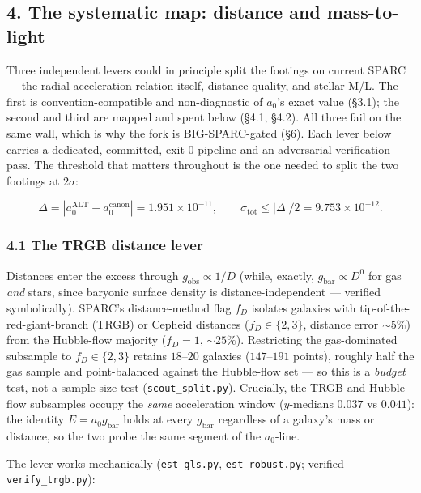 \documentclass[
]{article}
\begin{document}
\subsection{4. The systematic map: distance and
mass-to-light}\label{the-systematic-map-distance-and-mass-to-light}

Three independent levers could in principle split the footings on
current SPARC --- the radial-acceleration relation itself, distance
quality, and stellar M/L. The first is convention-compatible and
non-diagnostic of \(a_0\)'s exact value (§3.1); the second and third are
mapped and spent below (§4.1, §4.2). All three fail on the same wall,
which is why the fork is BIG-SPARC-gated (§6). Each lever below carries
a dedicated, committed, exit-0 pipeline and an adversarial verification
pass. The threshold that matters throughout is the one needed to split
the two footings at \(2\sigma\):

\[\Delta=|a_0^\mathrm{ALT}-a_0^\mathrm{canon}|=1.951\times10^{-11},\qquad \sigma_\mathrm{tot}\le|\Delta|/2=9.753\times10^{-12}.\]

\subsubsection{4.1 The TRGB distance
lever}\label{the-trgb-distance-lever}

Distances enter the excess through \(g_\mathrm{obs}\propto1/D\) (while,
exactly, \(g_\mathrm{bar}\propto D^0\) for gas \emph{and} stars, since
baryonic surface density is distance-independent --- verified
symbolically). SPARC's distance-method flag \(f_D\) isolates galaxies
with tip-of-the-red-giant-branch (TRGB) or Cepheid distances
(\(f_D\in\{2,3\}\), distance error \(\sim5\%\)) from the Hubble-flow
majority (\(f_D=1\), \(\sim25\%\)). Restricting the gas-dominated
subsample to \(f_D\in\{2,3\}\) retains \(18\)--\(20\) galaxies
(\(147\)--\(191\) points), roughly half the gas sample and
point-balanced against the Hubble-flow set --- so this is a
\emph{budget} test, not a sample-size test (\texttt{scout\_split.py}).
Crucially, the TRGB and Hubble-flow subsamples occupy the \emph{same}
acceleration window (\(y\)-medians \(0.037\) vs \(0.041\)): the identity
\(E=a_0 g_\mathrm{bar}\) holds at every \(g_\mathrm{bar}\) regardless of a
galaxy's mass or distance, so the two probe the same segment of the
\(a_0\)-line.

The lever works mechanically (\texttt{est\_gls.py},
\texttt{est\_robust.py}; verified \texttt{verify\_trgb.py}):
\end{document}
